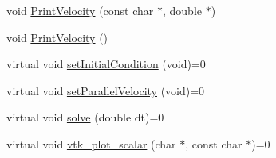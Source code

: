 \begin{DoxyCompactItemize}
\item 
void \hyperlink{class_incompress___solver___smooth___basis_aa17ecee1fcdfdb8053d194204324fa78}{Print\+Velocity} (const char $\ast$, double $\ast$)
\item 
void \hyperlink{class_incompress___solver___smooth___basis_aeab5402ceb5fce1e1ce379aced80a6ca}{Print\+Velocity} ()
\item 
virtual void \hyperlink{class_incompress___solver___smooth___basis_a1621441e8815f61c164474ebde60f51a}{set\+Initial\+Condition} (void)=0
\item 
virtual void \hyperlink{class_incompress___solver___smooth___basis_a011c6b8fc8c0051523bd684187678a90}{set\+Parallel\+Velocity} (void)=0
\item 
virtual void \hyperlink{class_incompress___solver___smooth___basis_a23cb0b79f81e0d10dcf8765386e88192}{solve} (double dt)=0
\item 
virtual void \hyperlink{class_incompress___solver___smooth___basis_a6b4a774a25fd752bfa05fe764cb55c4d}{vtk\+\_\+plot\+\_\+scalar} (char $\ast$, const char $\ast$)=0
\end{DoxyCompactItemize}
